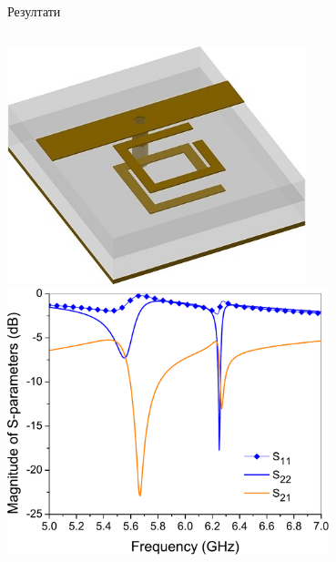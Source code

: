 \documentclass{beamer}
\begin{document}
\begin{frame}[t]{Резултати}
\begin{columns}[c]
\includegraphics[width=0.65\textwidth]{slike/n1.jpeg}\\[0.5cm]
    \includegraphics[width=0.70\textwidth]{slike/14a.pdf}


\end{columns}
\end{frame}
\end{document}
